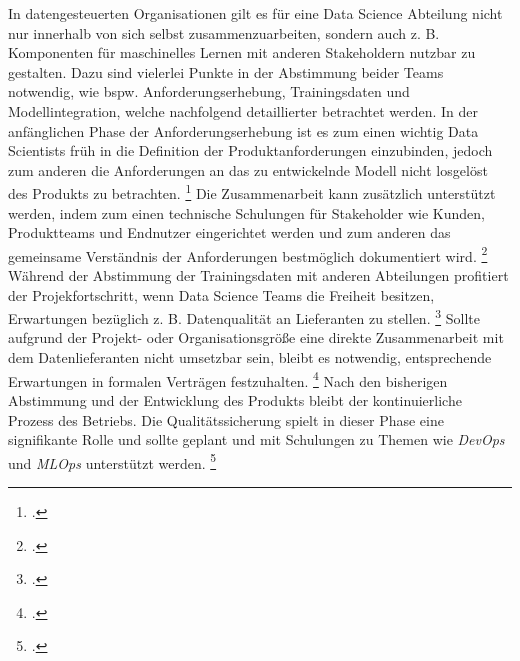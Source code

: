 In datengesteuerten Organisationen gilt es für eine Data Science Abteilung nicht nur innerhalb von sich selbst zusammenzuarbeiten, sondern auch z. B. Komponenten für maschinelles Lernen mit anderen Stakeholdern nutzbar zu gestalten.
Dazu sind vielerlei Punkte in der Abstimmung beider Teams notwendig, wie bspw. Anforderungserhebung, Trainingsdaten und Modellintegration, welche nachfolgend detaillierter betrachtet werden.
In der anfänglichen Phase der Anforderungserhebung ist es zum einen wichtig Data Scientists früh in die Definition der Produktanforderungen einzubinden, jedoch zum anderen die Anforderungen an das zu entwickelnde Modell nicht losgelöst des Produkts zu betrachten. \footcite[Vgl.][S. 418]{Nahar.2022}
Die Zusammenarbeit kann zusätzlich unterstützt werden, indem zum einen technische Schulungen für Stakeholder wie Kunden, Produktteams und Endnutzer eingerichtet werden und zum anderen das gemeinsame Verständnis der Anforderungen bestmöglich dokumentiert wird. \footcite[Vgl.][S. 418]{Nahar.2022}
Während der Abstimmung der Trainingsdaten mit anderen Abteilungen profitiert der Projekfortschritt, wenn Data Science Teams die Freiheit besitzen, Erwartungen bezüglich z. B. Datenqualität an Lieferanten zu stellen. \footcite[Vgl.][S. 420]{Nahar.2022}
Sollte aufgrund der Projekt- oder Organisationsgröße eine direkte Zusammenarbeit mit dem Datenlieferanten nicht umsetzbar sein, bleibt es notwendig, entsprechende Erwartungen in formalen Verträgen festzuhalten. \footcite[Vgl.][S. 420]{Nahar.2022}
Nach den bisherigen Abstimmung und der Entwicklung des Produkts bleibt der kontinuierliche Prozess des Betriebs.
Die Qualitätssicherung spielt in dieser Phase eine signifikante Rolle und sollte geplant und mit Schulungen zu Themen wie \textit{DevOps} und \textit{MLOps} unterstützt werden. \footcite[Vgl.][S. 423]{Nahar.2022}